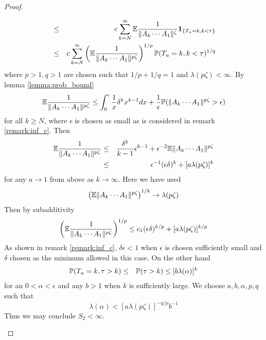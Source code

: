 \documentclass{article}
\theoremstyle{remark}
\begin{document}
\begin{proof}
\begin{enumerate}
\begin{eqnarray*}
        &\leq& c \sum_{k=N}^{\infty}
        \E {1 \over \|A_k \cdots A_1\|^\zeta} \1{T_u = k, k < \tau} \\
        &\leq& c \sum_{k=N}^{\infty}
        \left(
          \E {1 \over \|A_k \cdots A_1\|^{p \zeta}}
          \right)^{1/p}
          \P(T_u = k, k < \tau)^{1/q} \\
      \end{eqnarray*}
      where $p > 1, q > 1$ are chosen such that $1/p + 1/q = 1$ and
      $\lambda(p\zeta) < \infty$. By lemma \ref{lemma:prob_bound}
      \[
      \E {1 \over \|A_k \cdots A_1\|^{p \zeta}} \leq 
      \int_0^\epsilon {1 \over x} \delta^k x^{k-1} dx
      +
      {1 \over \epsilon} \P(\|A_k \cdots A_1\|^{p \zeta} > \epsilon)
      \]
      for all $k \geq N$, where $\epsilon$ is chosen as small as is considered in remark
      \ref{remark:inf_c}. Then
        \begin{eqnarray*}
          \E {1 \over \|A_k \cdots A_1\|^{p \zeta}} &\leq& {\delta^k
            \over k-1} \epsilon^{k-1} + \epsilon^{-2} \E \|A_k \cdots
          A_1\|^{p \zeta} \\
          &\leq& \epsilon^{-1} (\epsilon \delta)^k + [a \lambda(p\zeta)]^k
        \end{eqnarray*}
        for any $a \to 1$ from above as $k \to \infty$. Here we have used
        \[
        \left(
          \E \|A_k \cdots A_1\|^{p \zeta}
        \right)^{1/k} \to \lambda(p\zeta)
        \]
        Then by subadditivity
        \[
        \left(
          \E {
            1 \over 
            \|A_k \cdots A_1\|^{p \zeta}
          }
        \right)^{1/p} \leq c_1 (\epsilon \delta)^{k/p} + [a \lambda(p\zeta)]^{k/p}
        \]
        As shown in remark \ref{remark:inf_c}, $\delta \epsilon < 1$
        when $\epsilon$ is chosen sufficiently small and $\delta$ chosen
        as the minimum allowed in this case. On the other hand
        \begin{eqnarray*}
          \P(T_u = k, \tau > k) &\leq& \P(\tau > k) \leq [b \lambda(\alpha)]^k
        \end{eqnarray*}
        for an $0 < \alpha < \epsilon$ and any $b > 1$ when $k$ is
        sufficiently large. We choose $a, b, \alpha, p, q$ such that
        \[
        \lambda(\alpha) < [a \lambda(p\zeta)]^{-q/p} b^{-1}
        \]
        Thus we may conclude $S_2 < \infty$.


\end{enumerate}
\end{proof}
\end{document}
